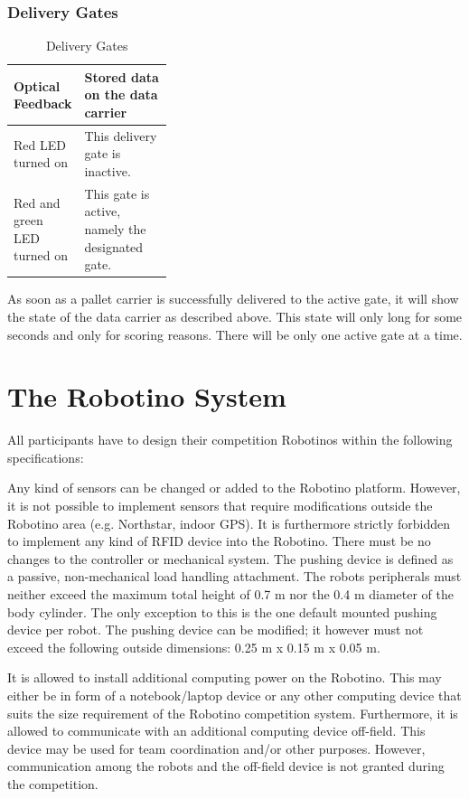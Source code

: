 \documentclass[12pt,twoside]{article}
\newcommand{\Robotino}{Robotino\textregistered}
\begin{document}
\subsubsection{Delivery Gates} \begin{table}[h]
  \centering
  \begin{tabularx}{\linewidth}{p{0.35\linewidth}|X}
    \multicolumn{1}{l}{Optical Feedback} &\multicolumn{1}{l}{Stored
      data on the data carrier}\\\hline
    Red LED turned on & This delivery gate is inactive.\\
    Red and green LED turned on & This gate is active, namely the designated gate.\\
    \hline
  \end{tabularx}
  \caption{Delivery Gates}
  \label{tab:delivery-gates}
\end{table}

As soon as a pallet carrier is successfully delivered to the active
gate, it will show the state of the data carrier as described above.
This state will only long for some seconds and only for scoring
reasons. There will be only one active gate at a time.



\section{The Robotino System}

All participants have to design their competition Robotinos within
the following specifications:

Any kind of sensors can be changed or added to the Robotino platform.
However, it is not possible to implement sensors that require
modifications outside the Robotino area (e.g. Northstar, indoor GPS).
It is furthermore strictly forbidden to implement any kind of RFID
device into the Robotino. There must be no changes to the controller
or mechanical system. The pushing device is defined as a passive,
non-mechanical load handling attachment. The robots peripherals must
neither exceed the maximum total height of 0.7 m nor the 0.4 m
diameter of the body cylinder. The only exception to this is the one
default mounted pushing device per robot. The pushing device can be
modified; it however must not exceed the following outside dimensions:
0.25 m x 0.15 m x 0.05 m.

  It is allowed to install additional computing power on the
  \Robotino. This may either be in form of a notebook/laptop device or
  any other computing device that suits the size requirement of the
  \Robotino{} competition system. Furthermore, it is allowed to
  communicate with an additional computing device off-field. This
  device may be used for team coordination and/or other
  purposes. However, communication among the robots and the off-field
  device is not granted during the competition.
\end{document}
